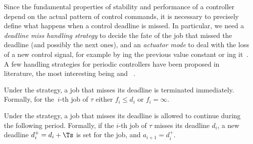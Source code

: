 Since the fundamental properties of stability and performance of a controller depend on the actual pattern of control commands, it is necessary to precisely define what happens when a control deadline is missed.
In particular, we need a \emph{deadline miss handling strategy} to decide the fate of the job that missed the deadline (and possibly the next ones), and an \emph{actuator mode} to deal with the loss of a new control signal, for example by \tH{}ing the previous value constant or \tZ{}ing it~\cite{schenato09}.
A few handling strategies for periodic controllers have been proposed in literature, the most interesting being \emph{\tK{}} and \emph{\tS{}}~\cite{Cervin:2005,Pazzaglia:2019,Maggio:2020}.

\begin{definition}[\tK{} strategy]%
    \label{def:kill}%
    Under the \tK{} strategy, a job that misses its deadline is terminated immediately. 
    Formally, for the~$i$-th job of $\tau$ either $f_i\leq d_i$ or $f_i=\infty$.
\end{definition}

\begin{definition}[\tS{} strategy]%
    \label{def:skip}%
    Under the \tS{} strategy, a job that misses its deadline is allowed to continue during the following period.
    Formally, if the $i$-th job of $\tau$ misses its deadline $d_i$, a new deadline $d^{+}_i = d_i + \Ts$ is set for the job, and $a_{i+1} = d^{+}_i$.
\end{definition}



